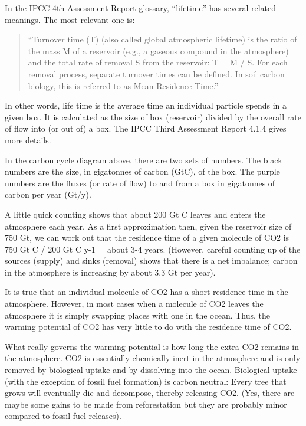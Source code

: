 \documentclass[
]{book}
\begin{document}
In the IPCC 4th Assessment Report glossary, ``lifetime'' has several related meanings. The most relevant one is:

\begin{quote}
``Turnover time (T) (also called global atmospheric lifetime) is the ratio of the mass M of a reservoir (e.g., a gaseous compound in the atmosphere) and the total rate of removal S from the reservoir: T = M / S. For each removal process, separate turnover times can be defined. In soil carbon biology, this is referred to as Mean Residence Time.''
\end{quote}

In other words, life time is the average time an individual particle spends in a given box. It is calculated as the size of box (reservoir) divided by the overall rate of flow into (or out of) a box. The IPCC Third Assessment Report 4.1.4 gives more details.

In the carbon cycle diagram above, there are two sets of numbers. The black numbers are the size, in gigatonnes of carbon (GtC), of the box. The purple numbers are the fluxes (or rate of flow) to and from a box in gigatonnes of carbon per year (Gt/y).

A little quick counting shows that about 200 Gt C leaves and enters the atmosphere each year. As a first approximation then, given the reservoir size of 750 Gt, we can work out that the residence time of a given molecule of CO2 is 750 Gt C / 200 Gt C y-1 = about 3-4 years. (However, careful counting up of the sources (supply) and sinks (removal) shows that there is a net imbalance; carbon in the atmosphere is increasing by about 3.3 Gt per year).

It is true that an individual molecule of CO2 has a short residence time in the atmosphere. However, in most cases when a molecule of CO2 leaves the atmosphere it is simply swapping places with one in the ocean. Thus, the warming potential of CO2 has very little to do with the residence time of CO2.

What really governs the warming potential is how long the extra CO2 remains in the atmosphere. CO2 is essentially chemically inert in the atmosphere and is only removed by biological uptake and by dissolving into the ocean. Biological uptake (with the exception of fossil fuel formation) is carbon neutral: Every tree that grows will eventually die and decompose, thereby releasing CO2. (Yes, there are maybe some gains to be made from reforestation but they are probably minor compared to fossil fuel releases).
\end{document}
